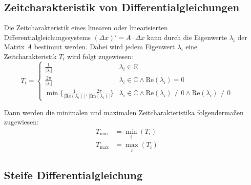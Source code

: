\documentclass[a4paper, 11pt, accentcolor = tud3b]{tudreport}
\providecommand{\abs}[1]{\ensuremath{{\lvert #1 \rvert}}}
\renewcommand{\Re}{\text{Re}}
\renewcommand{\Im}{\text{Im}}
\begin{document}
            \subsection{Zeitcharakteristik von Differentialgleichungen}
	            \label{sec:mathezeitCharakteristik}
	            
	            Die Zeitcharakteristik eines linearen oder linearisierten Differentialgleichungssystems \( (\Delta x)' = A \cdot \Delta x \) kann durch die Eigenwerte \( \lambda _ i \) der Matrix \(A\) bestimmt werden. Dabei wird jedem Eigenwert \(\lambda_i\) eine Zeitcharakteristik \( T_i \) wird folgt zugewiesen:
	            \begin{equation*}
		            T _ i =
			            \begin{cases}
				            \frac{1}{\abs{\lambda _ i}} & \lambda _ i \in \mathbb{R} \\
				            \frac{2\pi}{\abs{\lambda _ i}} & \lambda _ i \in \mathbb{C} \land \Re(\lambda _ i) = 0 \\
				            \min \Big\{ \frac{1}{\abs{\Re(\lambda _ i)}}, \frac{2\pi}{\abs{\Im(\lambda _ i)}} \Big\} & \lambda _ i \in \mathbb{C} \land \Re(\lambda _ i) \neq 0 \land \Re(\lambda _ i) \neq 0
			            \end{cases}
	            \end{equation*}
	            
	            Dann werden die minimalen und maximalen Zeitcharakteristika folgendermaßen zugewiesen:
	            \begin{align*}
		            T _ {\min} &= \min\limits _ i (T _ i) \\
		            T _ {\max} &= \max\limits _ i (T _ i)
	            \end{align*}

            \subsection{Steife Differentialgleichung} %
	            \label{sec:steife_dgl}
            
\end{document}
